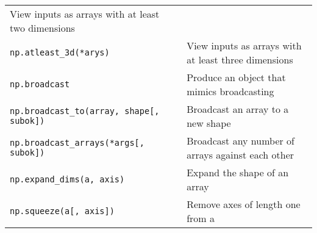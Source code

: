 \documentclass[a4paper,11pt]{book}
\numberwithin{figure}{chapter}
\numberwithin{table}{chapter}
\begin{document}
\begin{appendices}
\begin{table}
\begin{tabular}{lp{8.5cm}}
                View inputs as arrays with at least two dimensions\\
                \texttt{np.atleast\_3d(*arys)}&
                View inputs as arrays with at least three dimensions\\
                \texttt{np.broadcast}&
                Produce an object that mimics broadcasting\\
                \texttt{np.broadcast\_to(array, shape[, subok])}&
                Broadcast an array to a new shape\\
                \texttt{np.broadcast\_arrays(*args[, subok])}&
                Broadcast any number of arrays against each other\\
                \texttt{np.expand\_dims(a, axis)}&
                Expand the shape of an array\\
                \texttt{np.squeeze(a[, axis])}&
                Remove axes of length one from a\\
		\midrule
	\end{tabular}
\end{table}


\end{appendices}
\end{document}
